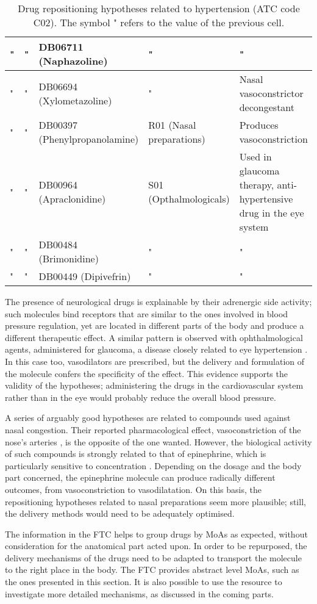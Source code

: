 \begin{table}[htbp]
\begin{tabular}{|p{2cm}|p{2cm}|p{2cm}|p{3cm}|p{4cm}|}
" & " & DB06711 (Naphazoline) & " & " \\ \hline
" & " & DB06694 (Xylometazoline) & " & Nasal vasoconstrictor decongestant \\ \hline
" & " & DB00397 (Phenylpropanolamine) & R01 (Nasal preparations) & Produces vasoconstriction \\ \hline
" & " & DB00964 (Apraclonidine) & S01 (Opthalmologicals) & Used in glaucoma therapy, anti-hypertensive drug in the eye system\\ \hline
" & " & DB00484 (Brimonidine) & " & " \\ \hline
" & " & DB00449 (Dipivefrin) & " & " \\ \hline
\end{tabular}
\caption{Drug repositioning hypotheses related to hypertension (ATC code C02). The symbol " refers to the value of the previous cell.}
\label{tab:tablel02}
\end{table}

The presence of neurological drugs is explainable by their adrenergic side activity; such molecules bind receptors that are similar to the ones involved in blood pressure regulation, yet are located in different parts of the body and produce a different therapeutic effect. A similar pattern is observed with ophthalmological agents, administered for glaucoma, a disease closely related to eye hypertension \citep{quigley1996number}. In this case too, vasodilators are prescribed, but the delivery and formulation of the molecule confers the specificity of the effect. This evidence supports the validity of the hypotheses; administering the drugs in the cardiovascular system rather than in the eye would probably reduce the overall blood pressure.

A series of arguably good hypotheses are related to compounds used against nasal congestion. Their reported pharmacological effect, vasoconstriction of the nose's arteries \citep{bende1996effect}, is the opposite of the one wanted. However, the biological activity of such compounds is strongly related to that of epinephrine, which is particularly sensitive to concentration \citep{evans2001epinephrine}. Depending on the dosage and the body part concerned, the epinephrine molecule can produce radically different outcomes, from vasoconstriction to vasodilatation. On this basis, the repositioning hypotheses related to nasal preparations seem more plausible; still, the delivery methods would need to be adequately optimised.

The information in the FTC helps to group drugs by MoAs as expected, without consideration for the anatomical part acted upon. In order to be repurposed, the delivery mechanisms of the drugs need to be adapted to transport the molecule to the right place in the body. The FTC provides abstract level MoAs, such as the ones presented in this section. It is also possible to use the resource to investigate more detailed mechanisms, as discussed in the coming parts.


